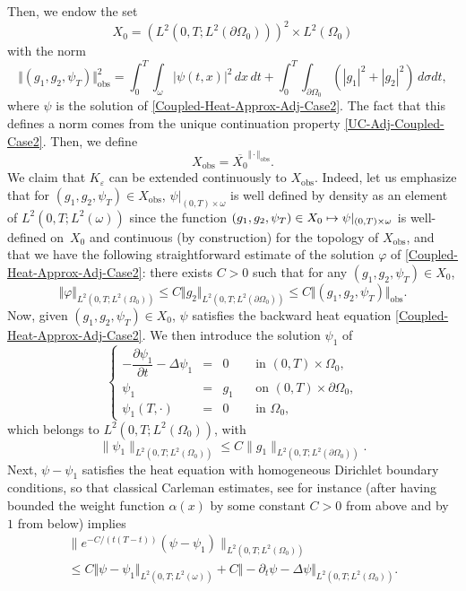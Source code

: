 \documentclass[11pt]{article}
\numberwithin{equation}{section}
\newcommand\mto{\mathchoice{\longmapsto}{\mapsto}{\mapsto}{\mapsto}}
\newcommand{\obs}{\mathrm{obs}}
\newcommand{\norm}[1]{\Vert#1\Vert}
\theoremstyle{definition}
\begin{document}
Then, we endow the set
\[
X_{0} = (L^2(0,T; L^2(\partial \Omega_0)))^2 \times L^2(\Omega_0)
\]
with the norm
\[
\norm{(g_1, g_2, \psi_T)}_{\obs}^2
=
\int_0^T \int_\omega |\psi(t,x)|^2 \, dx\,dt
+
\int_0^T \int_{\partial \Omega_0} \left(| g_1|^2 + |g_2|^2 \right) \, d\sigma dt,
\]
where $\psi$ is the solution of \eqref{Coupled-Heat-Approx-Adj-Case2}. The fact that this defines a norm comes from the unique continuation property \eqref{UC-Adj-Coupled-Case2}. Then, we define\begin{equation*}
X_{\obs} = \overline{X_{0}}^{\norm{\cdot}_{\obs}}.
\end{equation*}
We claim that $K_\varepsilon$ can be extended continuously to $X_{\obs}$. Indeed, let us emphasize that for $(g_1, g_2, \psi_T) \in X_{\obs}$, $\psi|_{(0,T) \times \omega}$ is well defined by density as an element of $L^2(0,T;L^2(\omega))$ since the function $(g_1, g_2, \psi_T) \in X_{0} \mto \psi|_{(0,T) \times \omega}$ is well-defined on~$X_0$ and continuous (by construction) for the topology of $X_{\obs}$, and that we have the following straightforward estimate of the solution $\varphi$ of \eqref{Coupled-Heat-Approx-Adj-Case2}: there exists $C>0$ such that for any $(g_1, g_2, \psi_T) \in X_{0}$,
\begin{equation}
\label{Est-Varphi-Direct}
\norm{ \varphi }_{L^2(0,T; L^2(\Omega_0))} \leq C \norm{ g_2}_{L^2(0,T; L^2(\partial \Omega_0))} \leq C \norm{(g_1, g_2, \psi_T)}_{\obs}.
\end{equation}
Now, given $(g_1, g_2, \psi_T) \in X_0$, $\psi$ satisfies the backward heat equation \eqref{Coupled-Heat-Approx-Adj-Case2}. We then introduce the solution $\psi_1$ of
\[
\left\{
\begin{array}{rcll}
- \dfrac{\partial \psi_1}{\partial t}-\Delta \psi_1 &=& 0 \quad&\text{ in }(0,T) \times \Omega_0,
\\
\psi_1 &=& g_1 &\text{ on }(0,T) \times \partial \Omega_0,
\\
\psi_1 \left(T,\cdot\right) &=& 0 &\text{ in }\Omega_0,
\end{array}
\right.
\]
which belongs to $L^2(0,T; L^2(\Omega_0))$, with
\[
\| \psi_1 \|_{L^2(0,T; L^2(\Omega_0))} \leq C \| g_1\|_{ L^2(0,T; L^2(\partial \Omega_0))}.
\]
Next, $\psi - \psi_1$ satisfies the heat equation with homogeneous Dirichlet boundary conditions, so that classical Carleman estimates, see for instance \cite[Th.\,9.4.1]{TWBook} (after having bounded the weight function $\alpha(x)$ by some constant $C>0$ from above and by $1$ from below) implies
\begin{multline*}
\| e^{-C/(t(T-t))} (\psi - \psi_1) \|_{L^2(0,T; L^2(\Omega_0))}\\
\leq
C \norm{\psi- \psi_1}_{L^2(0,T; L^2(\omega))}
+
{C\norm{ - \partial_t \psi - \Delta \psi }_{L^2(0,T; L^2(\Omega_0))}}.
\end{multline*}
\end{document}
